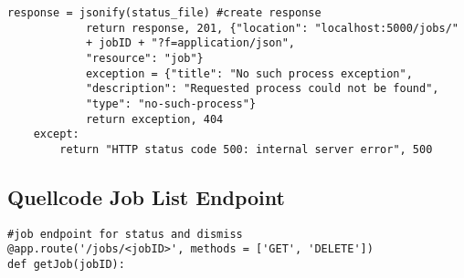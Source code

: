 \begin{lstlisting}[caption={Process Execution}, style = Python]
            response = jsonify(status_file) #create response
            return response, 201, {"location": "localhost:5000/jobs/" 
            + jobID + "?f=application/json", 
            "resource": "job"} 
            exception = {"title": "No such process exception", 
            "description": "Requested process could not be found", 
            "type": "no-such-process"}
            return exception, 404 
    except:
        return "HTTP status code 500: internal server error", 500
\end{lstlisting}\label{QuellcodeProcessExecution}   

\newpage
\subsection{Quellcode Job List Endpoint}
\begin{lstlisting}[caption={Job List Endpoint}, style = Python]
#job endpoint for status and dismiss
@app.route('/jobs/<jobID>', methods = ['GET', 'DELETE']) 
def getJob(jobID):
\end{lstlisting}\label{QuellcodeJobList}  

\newpage

